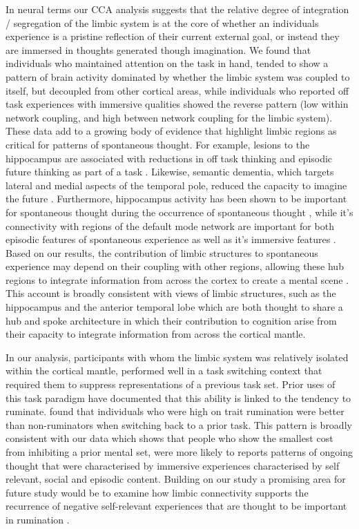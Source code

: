 In neural terms our CCA analysis suggests that the relative degree of integration / segregation of the limbic system is at the core of whether an individuals experience is a pristine reflection of their current external goal, or instead they are immersed in thoughts generated though imagination. We found that individuals who maintained attention on the task in hand, tended to show a pattern of brain activity dominated by whether the limbic system was coupled to itself, but decoupled from other cortical areas, while individuals who reported off task experiences with immersive qualities showed the reverse pattern (low within network coupling, and high between network coupling for the limbic system). These data add to a growing body of evidence that highlight limbic regions as critical for patterns of spontaneous thought. For example, lesions to the hippocampus are associated with reductions in off task thinking \cite{McCormick2018} and episodic future thinking as part of a task \cite{Maguire2011,Race2011}. Likewise, semantic dementia, which targets lateral and medial aspects of the temporal pole, reduced the capacity to imagine the future \cite{Irish2012,Viard2014}. Furthermore, hippocampus activity has been shown to be important for spontaneous thought during the occurrence of spontaneous thought \cite{Ellamil2016}, while it’s connectivity with regions of the default mode network are important for both episodic features of spontaneous experience \cite{Karapanagiotidis2017} as well as it’s immersive features \cite{Smallwood2016}. Based on our results, the contribution of limbic structures to spontaneous experience may depend on their coupling with other regions, allowing these hub regions to integrate information from across the cortex to create a mental scene \cite{Hassabis2009}. This account is broadly consistent with views of limbic structures, such as the hippocampus \cite{Moscovitch2016} and the anterior temporal lobe \cite{Lambon-Ralph2016} which are both thought to share a hub and spoke architecture in which their contribution to cognition arise from their capacity to integrate information from across the cortical mantle.

In our analysis, participants with whom the limbic system was relatively isolated within the cortical mantle, performed well in a task switching context that required them to suppress representations of a previous task set. Prior uses of this task paradigm have documented that this ability is linked to the tendency to ruminate.  found that individuals who were high on trait rumination were better than non-ruminators when switching back to a prior task. This pattern is broadly consistent with our data which shows that people who show the smallest cost from inhibiting a prior mental set, were more likely to reports patterns of ongoing thought that were characterised by immersive experiences characterised by self relevant, social and episodic content. Building on our study a promising area for future study would be to examine how limbic connectivity supports the recurrence of negative self-relevant experiences that are thought to be important in rumination \cite{Kleckner2017,Peters2016,Cooney2010}. 

